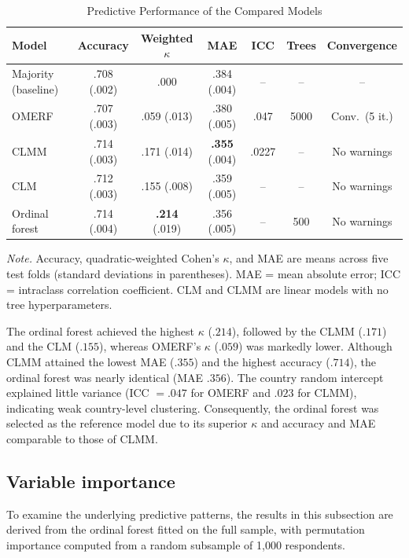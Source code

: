 \documentclass[12pt]{article}
\begin{document}
\begin{table}[H]
  \footnotesize
  \caption{Predictive Performance of the Compared Models}
  \label{tab:comparison}
  \begin{tabular}{lcccccc}
    \toprule
    Model & Accuracy & Weighted $\kappa$ & MAE & ICC & Trees & Convergence \\
    \midrule
    Majority (baseline) & .708 (.002) & .000 & .384 (.004) & -- & -- & -- \\
    OMERF & .707 (.003) & .059 (.013) & .380 (.005) & .047 & 5000 & Conv.\ (5 it.) \\
    CLMM  & .714 (.003) & .171 (.014) & \textbf{.355} (.004) & .0227 & -- & No warnings \\
    CLM   & .712 (.003) & .155 (.008) & .359 (.005) & -- & -- & No warnings \\
    Ordinal forest & .714 (.004) & \textbf{.214} (.019) & .356 (.005) & -- & 500 & No warnings \\
    \bottomrule
  \end{tabular}

  \vspace{6pt}

  \raggedright
  \textit{Note.} Accuracy, quadratic-weighted Cohen's $\kappa$, and MAE are means across five test
  folds (standard deviations in parentheses). MAE = mean absolute error; ICC = intraclass
  correlation coefficient. CLM and CLMM are linear models with no tree hyperparameters.
\end{table}

The ordinal forest achieved the highest $\kappa$ ($.214$), followed by the CLMM ($.171$) and the CLM
($.155$), whereas OMERF's $\kappa$ ($.059$) was markedly lower. Although CLMM attained the lowest MAE
 ($.355$) and the highest accuracy ($.714$), the ordinal forest was nearly identical (MAE $.356$). 
 The country random intercept explained little variance (ICC $= .047$ for OMERF and $.023$ for CLMM), indicating weak
country-level clustering. Consequently, the ordinal forest was selected as the reference model due to its superior 
 $\kappa$ and accuracy and MAE comparable to those of CLMM.

\subsection{Variable importance}

To examine the underlying predictive patterns, the results in this subsection are derived 
from the ordinal forest fitted on the full sample, with permutation importance computed from 
a random subsample of 1,000 respondents. 
\end{document}
